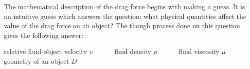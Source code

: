 The mathematical description of the drag force begins with making a guess. It is an intuitive guess which answers the question: what physical quantities affect the value of the drag force on an object? The though process done on this question gives the following answer:

relative fluid-object velocity $\upsilon$ \,\,\,\,\,\,\,\,\,\,\,\,\,\,\,  fluid density $\rho$ \,\,\,\,\,\,\,\,\,\,\,\,\,\,\, fluid viscosity $\mu$ \,\,\,\,\,\,\,\,\,\,\,\,\,\,\, geometry of an object $D$
